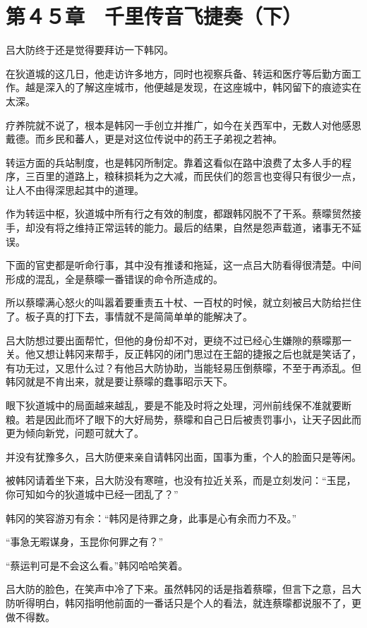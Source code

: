 \section{第４５章　千里传音飞捷奏（下）}

吕大防终于还是觉得要拜访一下韩冈。

在狄道城的这几日，他走访许多地方，同时也视察兵备、转运和医疗等后勤方面工作。越是深入的了解这座城市，他便越是发现，在这座城中，韩冈留下的痕迹实在太深。

疗养院就不说了，根本是韩冈一手创立并推广，如今在关西军中，无数人对他感恩戴德。而乡民和蕃人，更是对这位传说中的药王子弟视之若神。

转运方面的兵站制度，也是韩冈所制定。靠着这看似在路中浪费了太多人手的程序，三百里的道路上，粮秣损耗为之大减，而民伕们的怨言也变得只有很少一点，让人不由得深思起其中的道理。

作为转运中枢，狄道城中所有行之有效的制度，都跟韩冈脱不了干系。蔡曚贸然接手，却没有将之维持正常运转的能力。最后的结果，自然是怨声载道，诸事无不延误。

下面的官吏都是听命行事，其中没有推诿和拖延，这一点吕大防看得很清楚。中间形成的混乱，全是蔡曚一番错误的命令所造成的。

所以蔡曚满心怒火的叫嚣着要重责五十杖、一百杖的时候，就立刻被吕大防给拦住了。板子真的打下去，事情就不是简简单单的能解决了。

吕大防想过要出面帮忙，但他的身份却不对，更绕不过已经心生嫌隙的蔡曚那一关。他又想让韩冈来帮手，反正韩冈的闭门思过在王韶的捷报之后也就是笑话了，有功无过，又思什么过？有他吕大防协助，当能轻易压倒蔡曚，不至于再添乱。但韩冈就是不肯出来，就是要让蔡曚的蠢事昭示天下。

眼下狄道城中的局面越来越乱，要是不能及时将之处理，河州前线保不准就要断粮。若是因此而坏了眼下的大好局势，蔡曚和自己日后被责罚事小，让天子因此而更为倾向新党，问题可就大了。

并没有犹豫多久，吕大防便来亲自请韩冈出面，国事为重，个人的脸面只是等闲。

被韩冈请着坐下来，吕大防没有寒暄，也没有拉近关系，而是立刻发问：“玉昆，你可知如今的狄道城中已经一团乱了？”

韩冈的笑容游刃有余：“韩冈是待罪之身，此事是心有余而力不及。”

“事急无暇谋身，玉昆你何罪之有？”

“蔡运判可是不会这么看。”韩冈哈哈笑着。

吕大防的脸色，在笑声中冷了下来。虽然韩冈的话是指着蔡曚，但言下之意，吕大防听得明白，韩冈指明他前面的一番话只是个人的看法，就连蔡曚都说服不了，更做不得数。

